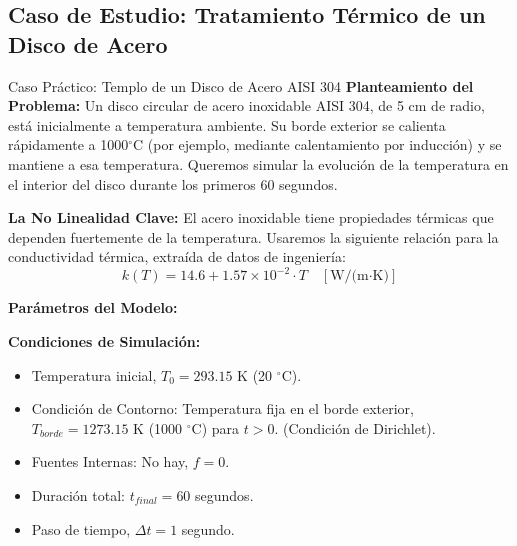 \documentclass[11pt, a4paper]{article}
\begin{document}
\subsection{Caso de Estudio: Tratamiento Térmico de un Disco de Acero}
\begin{examplebox}{Caso Práctico: Templo de un Disco de Acero AISI 304}
    \textbf{Planteamiento del Problema:} Un disco circular de acero inoxidable AISI 304, de 5 cm de radio, está inicialmente a temperatura ambiente. Su borde exterior se calienta rápidamente a 1000$^{\circ}$C (por ejemplo, mediante calentamiento por inducción) y se mantiene a esa temperatura. Queremos simular la evolución de la temperatura en el interior del disco durante los primeros 60 segundos.
    
    \textbf{La No Linealidad Clave:} El acero inoxidable tiene propiedades térmicas que dependen fuertemente de la temperatura. Usaremos la siguiente relación para la conductividad térmica, extraída de datos de ingeniería:
    $$ k(T) = 14.6 + 1.57 \times 10^{-2} \cdot T \quad [\text{W/(m·K)}] $$
    
    \textbf{Parámetros del Modelo:}
        \item \textbf{Condiciones de Simulación:}
            \begin{itemize}
                \item Temperatura inicial, $T_0 = 293.15 \text{ K}$ (20 $^{\circ}$C).
                \item Condición de Contorno: Temperatura fija en el borde exterior, $T_{borde} = 1273.15 \text{ K}$ (1000 $^{\circ}$C) para $t>0$. (Condición de Dirichlet).
                \item Fuentes Internas: No hay, $f=0$.
                \item Duración total: $t_{final} = 60$ segundos.
                \item Paso de tiempo, $\Delta t = 1$ segundo.
            \end{itemize}
\end{examplebox}
\end{document}
